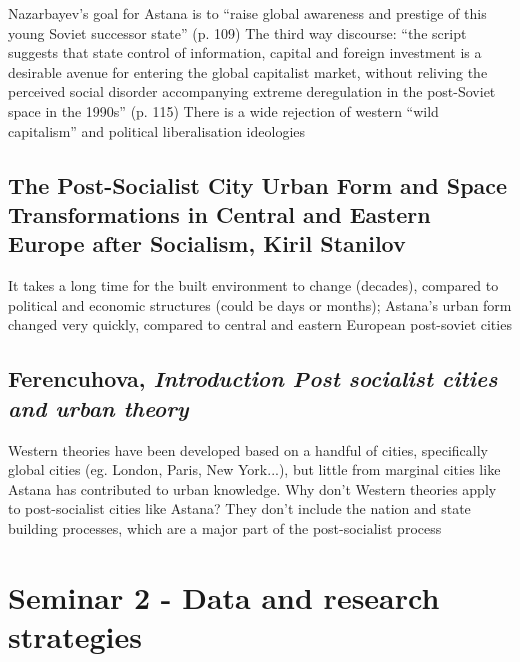 \documentclass{article}
\begin{document}
\begin{outline}
	\1 Nazarbayev's goal for Astana is to ``raise global awareness and prestige of this young Soviet successor state'' (p. 109)
	\1 The third way discourse: ``the script suggests that state control of information, capital and foreign investment is a desirable avenue for entering the global capitalist market, without reliving the perceived social disorder accompanying extreme deregulation in the post-Soviet space in the 1990s'' (p. 115)
	\2 There is a wide rejection of western ``wild capitalism'' and political liberalisation ideologies
\end{outline}

\subsection{The Post-Socialist City Urban Form and Space Transformations in Central and Eastern Europe after Socialism, Kiril Stanilov}

\begin{outline}
	\1 It takes a long time for the built environment to change (decades), compared to political and economic structures (could be days or months); Astana's urban form changed very quickly, compared to central and eastern European post-soviet cities
\end{outline}

\subsection{Ferencuhova, \textit{Introduction Post socialist cities and urban theory}}

\begin{outline}
	\1 Western theories have been developed based on a handful of cities, specifically global cities (eg. London, Paris, New York...), but little from marginal cities like Astana has contributed to urban knowledge. 
	\1 Why don't Western theories apply to post-socialist cities like Astana?
		\2 They don't include the nation and state building processes, which are a major part of the post-socialist process
		
\end{outline}




\section{Seminar 2 - Data and research strategies}
\end{document}
